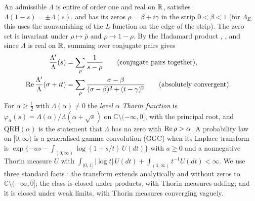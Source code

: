 An admissible $\Lambda$ is entire of order one and real on $\mathbb{R}$, satisfies $\Lambda(1-s)=\pm\Lambda(s)$, and has its zeros $\rho=\beta+i\gamma$ in the strip $0<\beta<1$ (for $\Lambda_E$ this uses the nonvanishing of the $L$ function on the edge of the strip). The zero set is invariant under $\rho\mapsto\bar\rho$ and $\rho\mapsto1-\rho$. By the Hadamard product \cite[Ch.~12]{Davenport}, \cite[Thm.~5.6]{IwaniecKowalski04}, and since $\Lambda$ is real on $\mathbb{R}$, summing over conjugate pairs gives
\begin{align}
\frac{\Lambda'}{\Lambda}(s)&=\sum_\rho\frac1{s-\rho}\qquad(\text{conjugate pairs together}),\label{iw:eq:logderiv}\\
\operatorname{Re}\frac{\Lambda'}{\Lambda}(\sigma+it)&=\sum_\rho\frac{\sigma-\beta}{(\sigma-\beta)^2+(t-\gamma)^2}\qquad(\text{absolutely convergent}).\label{iw:eq:relogderiv}
\end{align}
For $\alpha\ge\frac12$ with $\Lambda(\alpha)\ne0$ the \emph{level $\alpha$ Thorin function} is $\varphi_\alpha(s)=\Lambda(\alpha)/\Lambda(\alpha+\sqrt s)$ on $\mathbb C\setminus(-\infty,0]$, with the principal root, and $\mathrm{QRH}(\alpha)$ is the statement that $\Lambda$ has no zero with $\operatorname{Re}\rho>\alpha$. A probability law on $[0,\infty)$ is a generalised gamma convolution (GGC) when its Laplace transform is $\exp\{-as-\int_{(0,\infty)}\log(1+s/t)\,U(dt)\}$ with $a\ge0$ and a nonnegative Thorin measure $U$ with $\int_{(0,1]}|\log t|\,U(dt)+\int_{(1,\infty)}t^{-1}U(dt)<\infty$. We use three standard facts \cite{Bondesson}: the transform extends analytically and without zeros to $\mathbb C\setminus(-\infty,0]$; the class is closed under products, with Thorin measures adding; and it is closed under weak limits, with Thorin measures converging vaguely.

